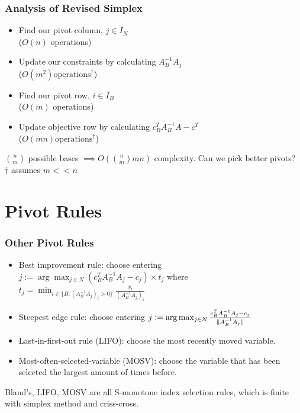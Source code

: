 \documentclass{beamer}
\DeclarePairedDelimiter{\norm}{\lVert}{\rVert}
\begin{document}
\begin{frame}
	\frametitle{Analysis of Revised Simplex}
	\begin{itemize}
		\item Find our pivot column, $j \in I_N$ \\
		($O(n)$ operations)
		\item Update our constraints by calculating $A_B^{-1}A_j$ \\
		($O(m^2) \text{operations}^{\dagger}$)
		\item Find our pivot row, $i \in I_B$ \\
		($O(m)$ operations)
		\item Update objective row by calculating $c_B^T A_B^{-1} A - c^T$ \\
		($O(mn) \text{operations}^{\dagger}$)
	\end{itemize}
	$\binom{n}{m}$ possible bases $\implies O(\binom{n}{m} mn)$ complexity. Can we pick better pivots? \\
	$\dagger$ assumes $m << n$ \\
\end{frame}


\section{Pivot Rules} %
\begin{frame}
\frametitle{Other Pivot Rules}
\begin{itemize}
\item Best improvement rule: choose entering $j := \arg \max_{j\in N}(c_B^T A_B^{-1} A_j - c_j)\times t_j$ where $t_j = \min_{i \in \{B:(A_B^{-1}A_j)_{i} >0\}} \frac{x_i}{(A_B^{-1}A_j)_{i}}$
\item Steepest edge rule: choose entering $j: = \arg\max_{j \in N} \frac{c_B^TA_B^{-1}A_j - c_j}{\norm{A_B^{-1}A_j}}$
\item Last-in-first-out rule (LIFO): choose the most recently moved variable.
\item Most-often-selected-variable (MOSV): choose the variable that has been selected the largest amount of times before.
\end{itemize}
Bland's, LIFO, MOSV are all S-monotone index selection rules, which is finite with simplex method and criss-cross.
\end{frame}
\end{document}

